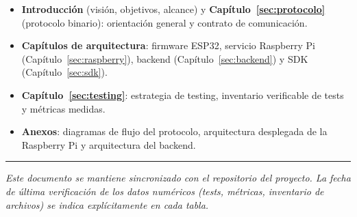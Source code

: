 \begin{itemize}[leftmargin=*, label=--]
    \item \textbf{Introducción} (visión, objetivos, alcance) y \textbf{Capítulo~\ref{sec:protocolo}}
          (protocolo binario): orientación general y contrato de comunicación.
    \item \textbf{Capítulos de arquitectura}: firmware ESP32, servicio Raspberry Pi
          (Capítulo~\ref{sec:raspberry}), backend (Capítulo~\ref{sec:backend}) y
          SDK (Capítulo~\ref{sec:sdk}).
    \item \textbf{Capítulo~\ref{sec:testing}}: estrategia de testing, inventario
          verificable de tests y métricas medidas.
    \item \textbf{Anexos}: diagramas de flujo del protocolo, arquitectura
          desplegada de la Raspberry Pi y arquitectura del backend.
\end{itemize}

\noindent\rule{\textwidth}{0.4pt}
\vspace{0.4em}

\noindent\textit{Este documento se mantiene sincronizado con el repositorio del
proyecto. La fecha de última verificación de los datos numéricos (tests, métricas,
inventario de archivos) se indica explícitamente en cada tabla.}
